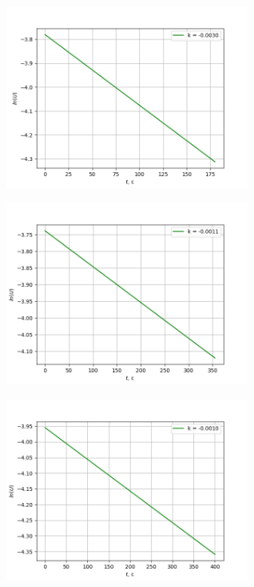 \begin{figure}[!h]
    \centering
    \begin{subfigure}{0.45\textwidth}
        \includegraphics[width=8cm]{plot1.png}
    \end{subfigure}
    \hfill
    \begin{subfigure}{0.45\textwidth}
        \includegraphics[width=8cm]{plot2.png}
    \end{subfigure}
    \vfill
    \begin{subfigure}{0.45\textwidth}
        \includegraphics[width=8cm]{plot3.png}
    \end{subfigure}
    \hfill
    \begin{subfigure}{0.45\textwidth}

\end{subfigure}
\end{figure}
